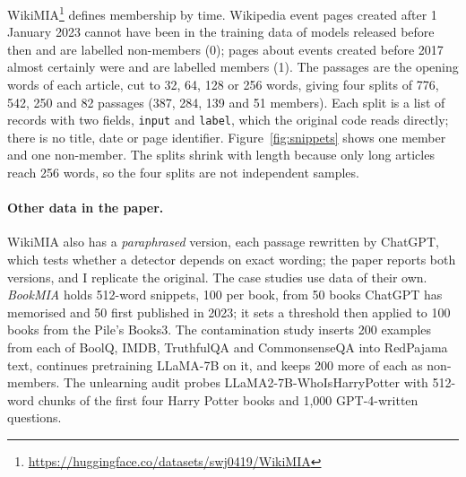 \documentclass[11pt]{article}
\begin{document}
WikiMIA\footnote{\url{https://huggingface.co/datasets/swj0419/WikiMIA}} \citep{wikimia2023} defines membership by time. Wikipedia event pages created after 1 January 2023 cannot have been in the training data of models released before then and are labelled non-members (0); pages about events created before 2017 almost certainly were and are labelled members (1). The passages are the opening words of each article, cut to 32, 64, 128 or 256 words, giving four splits of 776, 542, 250 and 82 passages (387, 284, 139 and 51 members). Each split is a list of records with two fields, \texttt{input} and \texttt{label}, which the original code reads directly; there is no title, date or page identifier. Figure~\ref{fig:snippets} shows one member and one non-member. The splits shrink with length because only long articles reach 256 words, so the four splits are not independent samples.

\paragraph{Other data in the paper.} WikiMIA also has a \emph{paraphrased} version, each passage rewritten by ChatGPT, which tests whether a detector depends on exact wording; the paper reports both versions, and I replicate the original. The case studies use data of their own. \emph{BookMIA} holds 512-word snippets, 100 per book, from 50 books ChatGPT has memorised \citep{chang2023speak} and 50 first published in 2023; it sets a threshold then applied to 100 books from the Pile's Books3. The contamination study inserts 200 examples from each of BoolQ, IMDB, TruthfulQA and CommonsenseQA into RedPajama text, continues pretraining LLaMA-7B on it, and keeps 200 more of each as non-members. The unlearning audit probes LLaMA2-7B-WhoIsHarryPotter \citep{eldan2023harrypotter} with 512-word chunks of the first four Harry Potter books and 1,000 GPT-4-written questions.
\end{document}

